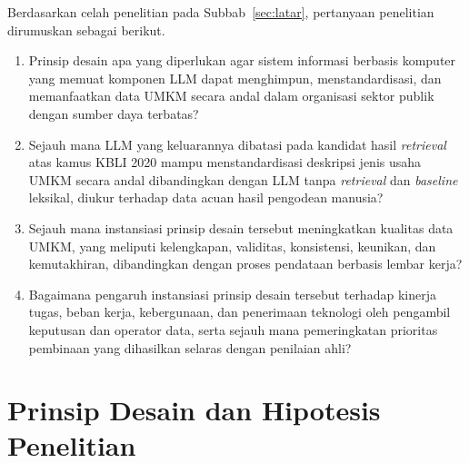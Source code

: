 \documentclass[12pt,a4paper]{report}
\begin{document}
Berdasarkan celah penelitian pada Subbab~\ref{sec:latar}, pertanyaan penelitian dirumuskan sebagai berikut.
\begin{enumerate}[label=\textbf{RQ\arabic*}:, leftmargin=*]
  \item Prinsip desain apa yang diperlukan agar sistem informasi berbasis komputer yang memuat komponen LLM dapat menghimpun, menstandardisasi, dan memanfaatkan data UMKM secara andal dalam organisasi sektor publik dengan sumber daya terbatas?
  \item Sejauh mana LLM yang keluarannya dibatasi pada kandidat hasil \textit{retrieval} atas kamus KBLI 2020 mampu menstandardisasi deskripsi jenis usaha UMKM secara andal dibandingkan dengan LLM tanpa \textit{retrieval} dan \textit{baseline} leksikal, diukur terhadap data acuan hasil pengodean manusia?
  \item Sejauh mana instansiasi prinsip desain tersebut meningkatkan kualitas data UMKM, yang meliputi kelengkapan, validitas, konsistensi, keunikan, dan kemutakhiran, dibandingkan dengan proses pendataan berbasis lembar kerja?
  \item Bagaimana pengaruh instansiasi prinsip desain tersebut terhadap kinerja tugas, beban kerja, kebergunaan, dan penerimaan teknologi oleh pengambil keputusan dan operator data, serta sejauh mana pemeringkatan prioritas pembinaan yang dihasilkan selaras dengan penilaian ahli?
\end{enumerate}

\section{Prinsip Desain dan Hipotesis Penelitian}
\label{sec:hipotesis}
\end{document}
